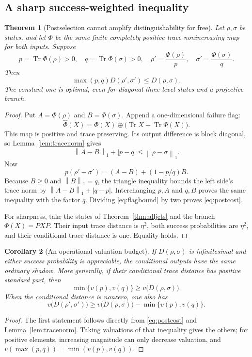 \documentclass[11pt,oneside]{article}
\numberwithin{equation}{section}
\theoremstyle{plain}
\newtheorem{theorem}{Theorem}[section]
\newtheorem{corollary}[theorem]{Corollary}
\theoremstyle{definition}
\theoremstyle{remark}
\newcommand{\Tr}{\operatorname{Tr}}
\newcommand{\norm}[1]{\left\|#1\right\|}
\begin{document}
\subsection{A sharp success-weighted inequality}
\begin{theorem}[Postselection cannot amplify distinguishability for free]\label{thm:cost}
Let $\rho,\sigma$ be states, and let $\Phi$ be the \emph{same} finite completely positive trace-nonincreasing map for both inputs. Suppose
\[
 p=\Tr\Phi(\rho)>0,\quad q=\Tr\Phi(\sigma)>0,
 \quad \rho'=\frac{\Phi(\rho)}p,\quad \sigma'=\frac{\Phi(\sigma)}q.
\]
Then
\begin{equation}\label{eq:postcost}
 \boxed{\ \max(p,q)D(\rho',\sigma')\le D(\rho,\sigma).\ }
\end{equation}
The constant one is optimal, even for diagonal three-level states and a projective branch.
\end{theorem}
\begin{proof}
Put $A=\Phi(\rho)$ and $B=\Phi(\sigma)$. Append a one-dimensional failure flag:
\[
 \widehat\Phi(X)=\Phi(X)\oplus\bigl(\Tr X-\Tr\Phi(X)\bigr).
\]
This map is positive and trace preserving. Its output difference is block diagonal, so Lemma~\ref{lem:tracenorm} gives
\begin{equation}\label{eq:flagbound}
 \norm{A-B}_1+|p-q|\le\norm{\rho-\sigma}_1.
\end{equation}
Now
\[
 p(\rho'-\sigma')=(A-B)+(1-p/q)B.
\]
Because $B\ge0$ and $\norm{B}_1=q$, the triangle inequality bounds the left side's trace norm by $\norm{A-B}_1+|q-p|$. Interchanging $p,A$ and $q,B$ proves the same inequality with the factor $q$. Dividing \eqref{eq:flagbound} by two proves \eqref{eq:postcost}.

For sharpness, take the states of Theorem~\ref{thm:alljets} and the branch $\Phi(X)=PXP$. Their input trace distance is $\eta^2$, both success probabilities are $\eta^2$, and their conditional trace distance is one. Equality holds.
\end{proof}

\begin{corollary}[An operational valuation budget]\label{cor:budget}
If $D(\rho,\sigma)$ is infinitesimal and either success probability is appreciable, the conditional outputs have the same ordinary shadow. More generally, if their conditional trace distance has positive standard part, then
\[
 \min\{v(p),v(q)\}\ge v\bigl(D(\rho,\sigma)\bigr).
\]
When the conditional distance is nonzero, one also has
\[
 v\bigl(D(\rho',\sigma')\bigr)
 \ge v\bigl(D(\rho,\sigma)\bigr)-\min\{v(p),v(q)\}.
\]
\end{corollary}
\begin{proof}
The first statement follows directly from \eqref{eq:postcost} and Lemma~\ref{lem:tracenorm}. Taking valuations of that inequality gives the others; for positive elements, increasing magnitude can only decrease valuation, and $v(\max(p,q))=\min(v(p),v(q))$.
\end{proof}
\end{document}
